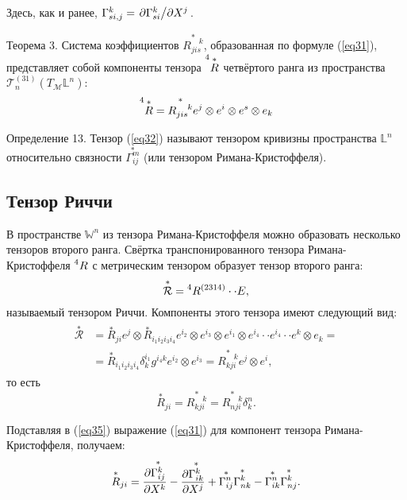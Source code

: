 \documentclass[14pt,a4paper]{extarticle}
\begin{document}
Здесь, как и ранее, $\Gamma_{si,j}^k = \pdv*{\Gamma_{si}^k}{X^j}$.


Теорема 3. Система коэффициентов $\overset{*}{R_{jis}^{\quad k}}$, образованная по формуле (\ref{eq31}), представляет собой компоненты тензора $\prescript{4}{}{\overset{*}{R}}$ четвёртого ранга из пространства $\mathcal{T}_n^{(31)} (T_\mathcal{M} \mathbb{L}^n)$:
\begin{equation}\label{eq32}
	\prescript{4}{}{\overset{*}{R}} = \overset{*}{R_{jis}^{\quad k}} e^j \otimes e^i \otimes e^s \otimes e_k
\end{equation}


Определение 13. Тензор (\ref{eq32}) называют тензором кривизны пространства $\mathbb{L}^n$ относительно связности $\overset{*}{\Gamma_{ij}^m}$ (или тензором Римана-Кристоффеля).


\subsection{Тензор Риччи}
В пространстве $\mathbb{W}^n$ из тензора Римана-Кристоффеля можно образовать несколько тензоров второго ранга. Свёртка транспонированного тензора Римана-Кристоффеля $\prescript{4}{}{R}$ с метрическим тензором образует тензор второго ранга:
\begin{equation}\label{eq33}
	\overset{*}{\mathcal{R}} = \prescript{4}{}{R}^{(2314)} \cdot \cdot E,
\end{equation}
называемый тензором Риччи. Компоненты этого тензора имеют следующий вид:
\begin{align}\label{eq34}
\begin{split}
	\overset{*}{\mathcal{R}} &= \overset{*}{R}_{ji}e^j \otimes \overset{*}{R}_{i_1i_2i_3i_4} e^{i_2} \otimes e^{i_3} \otimes e^{i_1} \otimes e^{i_4} \cdot \cdot e^{i_4} \cdot \cdot e^k \otimes e_k = \\
	&= \overset{*}{R}_{i_1i_2i_3i_4} \delta_k^{i_1}g^{i_4k}e^{i_2} \otimes e^{i_3} = \overset{*}{R_{kji}^{\quad k}} e^j \otimes e^i,
\end{split}
\end{align}
то есть
\begin{equation}\label{eq35}
	\overset{*}{R}_{ji} = \overset{*}{R_{kji}^{\quad k}} = \overset{*}{R_{nji}^{\quad k}}  \delta_k^n.
\end{equation}


Подставляя в (\ref{eq35}) выражение (\ref{eq31}) для компонент тензора Римана-Кристоффеля, получаем:
\begin{equation}\label{eq36}
	\overset{*}{R}_{ji} = \pdv{\overset{*}{\Gamma_{ij}^k}}{X^k} - \pdv{\overset{*}{\Gamma_{ik}^k}}{X^j} + \overset{*}{\Gamma_{ij}^n} \overset{*}{\Gamma_{nk}^k} - \overset{*}{\Gamma_{ik}^n} \overset{*}{\Gamma_{nj}^k}.
\end{equation}
\end{document}
